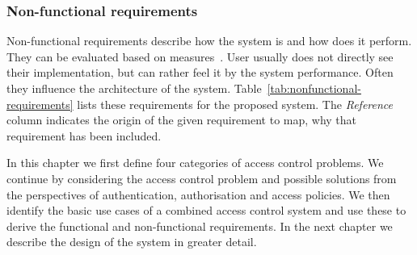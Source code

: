 \subsubsection{Non-functional requirements} \label{sec:analysis-nonfunctional}
Non-functional requirements describe how the system is and how does it perform. They can be evaluated based on measures~\cite{Adams2015NonfunctionalDesign}. User usually does not directly see their implementation, but can rather feel it by the system performance. Often they influence the architecture of the system. Table~\ref{tab:nonfunctional-requirements} lists these requirements for the proposed system. The \textit{Reference} column indicates the origin of the given requirement to map, why that requirement has been included.

\bigskip\noindent
In this chapter we first define four categories of access control problems. We continue by considering the access control problem and possible solutions from the perspectives of authentication, authorisation and access policies. We then identify the basic use cases of a combined access control system and use these to derive the functional and non-functional requirements. In the next chapter we describe the design of the system in greater detail.